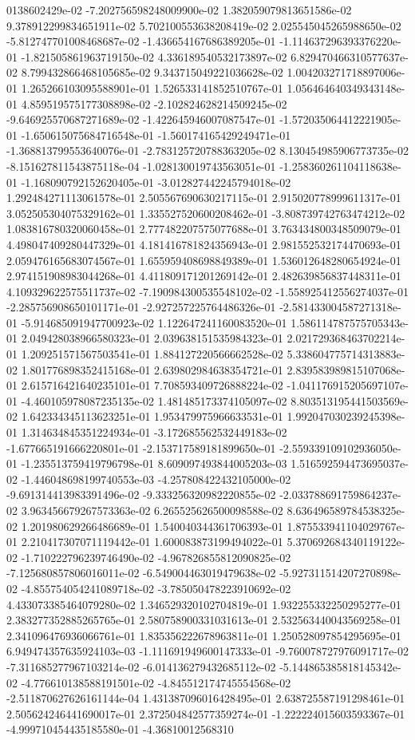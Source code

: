 0138602429e-02	-7.202756598248009900e-02	1.382059079813651586e-02	9.378912299834651911e-02	5.702100553638208419e-02	2.025545045265988650e-02	-5.812747701008468687e-02	-1.436654167686389205e-01	-1.114637296393376220e-01	-1.821505861963719150e-02	4.336189540532173897e-02	6.829470466310577637e-02	8.799432866468105685e-02	9.343715049221036628e-02	1.004203271718897006e-01	1.265266103095588901e-01	1.526533141852510767e-01	1.056464640349343148e-01	4.859519575177308898e-02	-2.102824628214509245e-02	-9.646925570687271689e-02	-1.422645946007087547e-01	-1.572035064412221905e-01	-1.650615075684716548e-01	-1.560174165429249471e-01	-1.368813799553640076e-01	-2.783125720788363205e-02	8.130454985906773735e-02	-8.151627811543875118e-04	-1.028130019743563051e-01	-1.258360261104118638e-01	-1.168090792152620405e-01	-3.012827442245794018e-02	1.292484271113061578e-01	2.505567690630217115e-01	2.915020778999611317e-01	3.052505304075329162e-01	1.335527520600208462e-01	-3.808739742763474212e-02	1.083816780320060458e-01	2.777482207575077688e-01	3.763434800348509079e-01	4.498047409280447329e-01	4.181416781824356943e-01	2.981552532174470693e-01	2.059476165683074567e-01	1.655959408698849389e-01	1.536012648280654924e-01	2.974151908983044268e-01	4.411809171201269142e-01	2.482639856837448311e-01	4.109329622575511737e-02	-7.190984300535548102e-02	-1.558925412556274037e-01	-2.285756908650101171e-01	-2.927257225764486326e-01	-2.581433004587271318e-01	-5.914685091947700923e-02	1.122647241160083520e-01	1.586114787575705343e-01	2.049428038966580323e-01	2.039638151535984323e-01	2.021729368463702214e-01	1.209251571567503541e-01	1.884127220566662528e-02	5.338604775714313883e-02	1.801776898352415168e-01	2.639802984638354721e-01	2.839583989815107068e-01	2.615716421640235101e-01	7.708593409726888224e-02	-1.041176915205697107e-01	-4.460105978087235135e-02	1.481485173374105097e-02	8.803513195441503569e-02	1.642334345113623251e-01	1.953479975966633531e-01	1.992047030239245398e-01	1.314634845351224934e-01	-3.172685562532449183e-02	-1.677665191666220801e-01	-2.153717589181899650e-01	-2.559339109102936050e-01	-1.235513759419796798e-01	8.609097493844005203e-03	1.516592594473695037e-02	-1.446048698199740553e-03	-4.257808422432105000e-02	-9.691314413983391496e-02	-9.333256320982220855e-02	-2.033788691759864237e-02	3.963456679267573363e-02	6.265525626500098588e-02	8.636496589784538325e-02	1.201980629266486689e-01	1.540040344361706393e-01	1.875533941104029767e-01	2.210417307071119442e-01	1.600083873199494022e-01	5.370692684340119122e-02	-1.710222796239746490e-02	-4.967826855812090825e-02	-7.125680857806016011e-02	-6.549004463019479638e-02	-5.927311514207270898e-02	-4.855754054241089718e-02	-3.785050478223910692e-02	4.433073385464079280e-02	1.346529320102704819e-01	1.932255332250295277e-01	2.383277352885265765e-01	2.580758900331031613e-01	2.532563440043569258e-01	2.341096476936066761e-01	1.835356222678963811e-01	1.250528097854295695e-01	6.949474357635924103e-03	-1.111691949600147333e-01	-9.760078727976091717e-02	-7.311685277967103214e-02	-6.014136279432685112e-02	-5.144865385818145342e-02	-4.776610138588191501e-02	-4.845512174745554568e-02	-2.511870627626161144e-04	1.431387096016428495e-01	2.638725587191298461e-01	2.505624246441690017e-01	2.372504842577359274e-01	-1.222224015603593367e-01	-4.999710454435185580e-01	-4.36810012568310